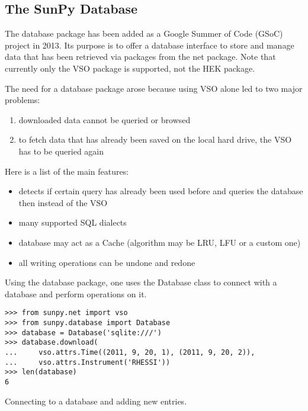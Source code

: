 \subsection{The SunPy Database}
The database package has been added as a Google Summer of Code (GSoC) project
in 2013. Its purpose is to offer a database interface to store and manage data
that has been retrieved via packages from the net package. Note that currently
only the VSO package is supported, not the HEK package.

The need for a database package arose because using VSO alone led to two major
problems:
\begin{enumerate}
  \item downloaded data cannot be queried or browsed
  \item to fetch data that has already been saved on the local hard drive,
    the VSO has to be queried again
\end{enumerate}

Here is a list of the main features:
\begin{itemize}
  \item detects if certain query has already been used before and queries
    the database then instead of the VSO
  \item many supported SQL dialects
  \item database may act as a Cache (algorithm may be LRU, LFU or a custom one)
  \item all writing operations can be undone and redone
\end{itemize}

Using the database package, one uses the Database class to connect with a
database and perform operations on it.

\begin{listing}[H]
\begin{verbatim}
>>> from sunpy.net import vso
>>> from sunpy.database import Database
>>> database = Database('sqlite:///')
>>> database.download(
...     vso.attrs.Time((2011, 9, 20, 1), (2011, 9, 20, 2)),
...     vso.attrs.Instrument('RHESSI'))
>>> len(database)
6
\end{verbatim}
\caption{Connecting to a database and adding new entries.}
\label{code:db_1}
\end{listing}

